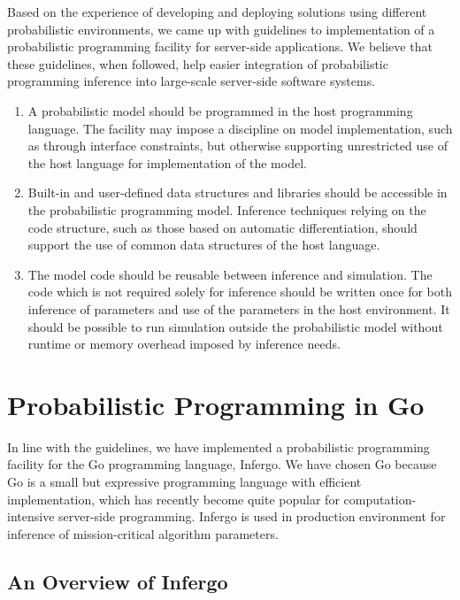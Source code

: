 \documentclass[sigplan,review,10pt,anonymous]{acmart}
\begin{document}
\begin{sloppypar}
Based on the experience of developing and deploying solutions
using different probabilistic environments, we came up with
guidelines to implementation of a probabilistic programming
facility for server-side applications. We believe that these
guidelines, when followed, help easier integration of
probabilistic programming inference into large-scale server-side
software systems.

\begin{enumerate}
\item A probabilistic model should be programmed in the host
programming language. The facility may impose a discipline on
model implementation, such as through interface constraints, but
otherwise supporting unrestricted use of the host language for
implementation of the model.

\item Built-in and user-defined data structures and libraries
should be accessible in the probabilistic programming model.
Inference techniques relying on the code structure, such as
those based on automatic differentiation, should support the
use of common data structures of the host language.

\item The model code should be reusable between inference and
simulation. The code which is not required solely for inference
should be written once for both inference of parameters and use
of the parameters in the host environment.  It should be
possible to run simulation outside the probabilistic model without
runtime or memory overhead imposed by inference needs.
\end{enumerate}

\section{Probabilistic Programming in Go}

In line with the guidelines, we have implemented a probabilistic
programming facility for the Go programming language, Infergo.
We have chosen Go because Go is a
small but expressive programming language with efficient
implementation, which has recently become quite popular for
computation-intensive server-side programming. Infergo is
used in production environment for inference of mission-critical
algorithm parameters.

\subsection{An Overview of Infergo}


\end{sloppypar}
\end{document}
